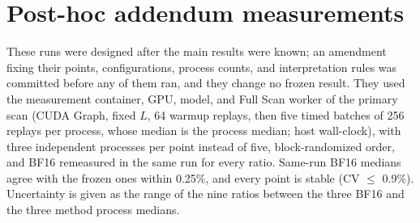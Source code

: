 \section{Post-hoc addendum measurements}
\label{app:addendum}

These runs were designed after the main results were known; an amendment fixing their points, configurations, process counts, and interpretation rules was committed before any of them ran, and they change no frozen result.
They used the measurement container, GPU, model, and Full Scan worker of the primary scan (CUDA Graph, fixed $L$, 64 warmup replays, then five timed batches of 256 replays per process, whose median is the process median; host wall-clock), with three independent processes per point instead of five, block-randomized order, and BF16 remeasured in the same run for every ratio.
Same-run BF16 medians agree with the frozen ones within 0.25\%, and every point is stable (CV $\leq$ 0.9\%).
Uncertainty is given as the range of the nine ratios between the three BF16 and the three method process medians.

